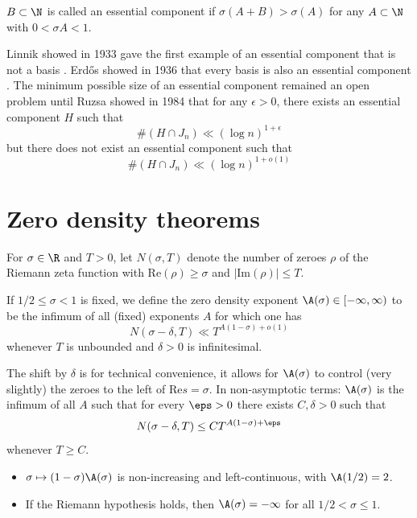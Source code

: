 \begin{definition}
    $B\subset \N$ is called an essential component if $\sigma(A+B)>\sigma(A)$ for any $A\subset\N$ with $0<\sigma A<1$.
\end{definition}

Linnik showed in 1933 gave the first example of an essential component that is not a basis \cite{zbMATH03105552}.
Erd\H{o}s showed in 1936 that every basis is also an essential component \cite{Erdos1935}.
The minimum possible size of an essential component remained an open problem until Ruzsa showed in 1984\cite{Ruzsa_1987} that for any $\epsilon>0$, there exists an essential component $H$ such that
$$\#(H\cap J_n)\ll (\log n)^{1+\epsilon}$$ but there does not exist an essential component such that
$$\#(H\cap J_n)\ll(\log  n)^{1+o(1)}$$


\chapter{Zero density theorems}\label{zero-density-chapter}

\begin{definition}\label{zero-def}  For $\sigma \in \R$ and $T>0$, let $N(\sigma,T)$ denote the number of zeroes $\rho$ of the Riemann zeta function with $\mathrm{Re}(\rho) \geq \sigma$ and $|\mathrm{Im}(\rho)| \leq T$.

If $1/2 \leq \sigma < 1$ is fixed, we define the zero density exponent $\A(\sigma) \in [-\infty,\infty)$ to be the infimum of all (fixed) exponents $A$ for which one has
    $$ N(\sigma-\delta,T) \ll T^{A (1-\sigma)+o(1)}$$
whenever $T$ is unbounded and $\delta>0$ is infinitesimal.
\end{definition}

The shift by $\delta$ is for technical convenience, it allows for $\A(\sigma)$ to control (very slightly) the zeroes to the left of $\mathrm{Re} s = \sigma$.  In non-asymptotic terms: $\A(\sigma)$ is the infimum of all $A$ such that for every $\eps>0$ there exists $C, \delta > 0$ such that
$$ N(\sigma-\delta, T) \leq C T^{A(1-\sigma)+\eps}$$
whenever $T \geq C$.

\begin{lemma}\label{zero-basic}
\begin{itemize}
\item[(i)] $\sigma \mapsto (1-\sigma) \A(\sigma)$ is non-increasing and left-continuous, with $\A(1/2)=2$.
\item[(ii)] If the Riemann hypothesis holds, then $\A(\sigma)=-\infty$ for all $1/2 < \sigma \leq 1$.
\end{itemize}
\end{lemma}

